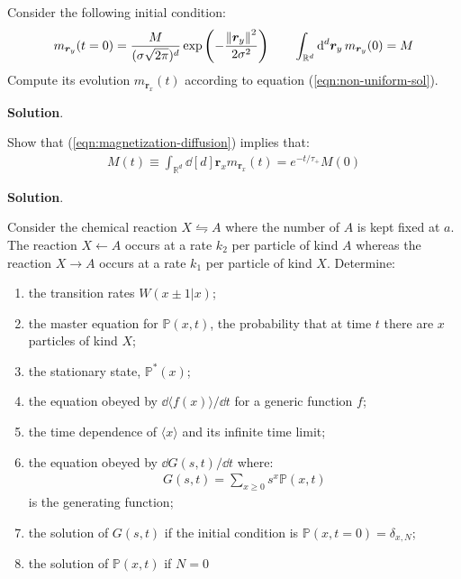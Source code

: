 \documentclass[../../main.tex]{subfiles}
\begin{document}
\begin{exo}
    Consider the following initial condition:
    \begin{align*}
        m_{\bm{r}_y}(t=0) = \frac{M}{(\sigma \sqrt{2 \pi})^d} \exp\left(-\frac{\norm{\bm{r}_y}^2}{2 \sigma^2} \right) \qquad \int_{\mathbb{R}^d} \dd[d]{\bm{r}_y} m_{\bm{r}_y}(0) = M
    \end{align*}
    Compute its evolution $m_{\bm{r}_x}(t)$ according to equation (\ref{eqn:non-uniform-sol}).

    \medskip

    \textbf{Solution}. 
\end{exo}

\begin{exo}
    Show that (\ref{eqn:magnetization-diffusion}) implies that:
    \begin{align*}
        M(t) \equiv \int_{\mathbb{R}^d} \dd[d]{\bm{r}_x} m_{\bm{r}_x}(t) = e^{-t/\tau_+} M(0)
    \end{align*}

    \medskip

    \textbf{Solution}. 
\end{exo}

\begin{exo}
    Consider the chemical reaction $X\leftrightharpoons A$ where the number of $A$ is kept fixed at $a$. The reaction $X \leftarrow A$ occurs at a rate $k_2$ per particle of kind $A$ whereas the reaction $X \rightarrow A$ occurs at a rate $k_1$ per particle of kind $X$. Determine:
    \begin{enumerate}
        \item the transition rates $W(x \pm 1|x)$;
        \item the master equation for $\mathbb{P}(x,t)$, the probability that at time $t$ there are $x$ particles of kind $X$;
        \item the stationary state, $\mathbb{P}^*(x)$;
        \item the equation obeyed by $\dd{\langle f(x) \rangle}/\dd{t}$ for a generic function $f$;
        \item the time dependence of $\langle x \rangle$ and its infinite time limit;
        \item the equation obeyed by $\dd{G(s,t)}/\dd{t}$ where:
        \begin{align*}
            G(s,t) = \sum_{x \geq 0} s^x \mathbb{P}(x,t)
        \end{align*}
        is the generating function;
        \item the solution of $G(s,t)$ if the initial condition is $\mathbb{P}(x,t=0) = \delta_{x,N}$;
        \item the solution of $\mathbb{P}(x,t)$ if $N=0$
    \end{enumerate}
    
\end{exo}
\end{document}
